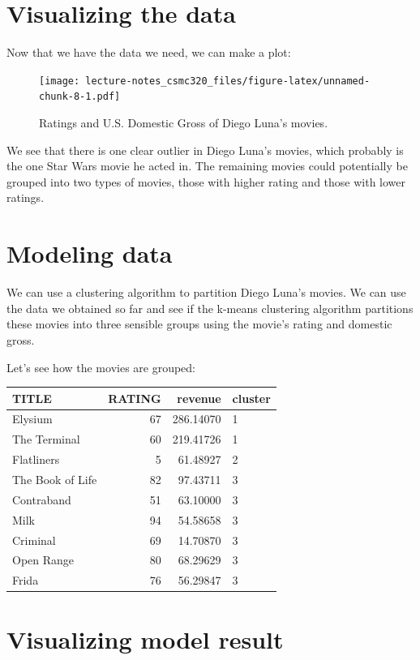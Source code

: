 \documentclass[12pt,]{book}
\theoremstyle{definition}
\theoremstyle{definition}
\theoremstyle{definition}
\theoremstyle{remark}
\begin{document}
\section{Visualizing the data}\label{visualizing-the-data}

Now that we have the data we need, we can make a plot:

\begin{figure}
\centering
\texttt{[image: lecture-notes\_csmc320\_files/figure-latex/unnamed-chunk-8-1.pdf]}
\caption{\label{fig:unnamed-chunk-8}Ratings and U.S. Domestic Gross of Diego
Luna's movies.}
\end{figure}

We see that there is one clear outlier in Diego Luna's movies, which
probably is the one Star Wars movie he acted in. The remaining movies
could potentially be grouped into two types of movies, those with higher
rating and those with lower ratings.

\section{Modeling data}\label{modeling-data}

We can use a clustering algorithm to partition Diego Luna's movies. We
can use the data we obtained so far and see if the k-means clustering
algorithm partitions these movies into three sensible groups using the
movie's rating and domestic gross.

Let's see how the movies are grouped:

\begin{tabular}{l|r|r|l}
\hline
TITLE & RATING & revenue & cluster\\
\hline
Elysium & 67 & 286.14070 & 1\\
\hline
The Terminal & 60 & 219.41726 & 1\\
\hline
Flatliners & 5 & 61.48927 & 2\\
\hline
The Book of Life & 82 & 97.43711 & 3\\
\hline
Contraband & 51 & 63.10000 & 3\\
\hline
Milk & 94 & 54.58658 & 3\\
\hline
Criminal & 69 & 14.70870 & 3\\
\hline
Open Range & 80 & 68.29629 & 3\\
\hline
Frida & 76 & 56.29847 & 3\\
\hline
\end{tabular}

\section{Visualizing model result}\label{visualizing-model-result}
\end{document}
